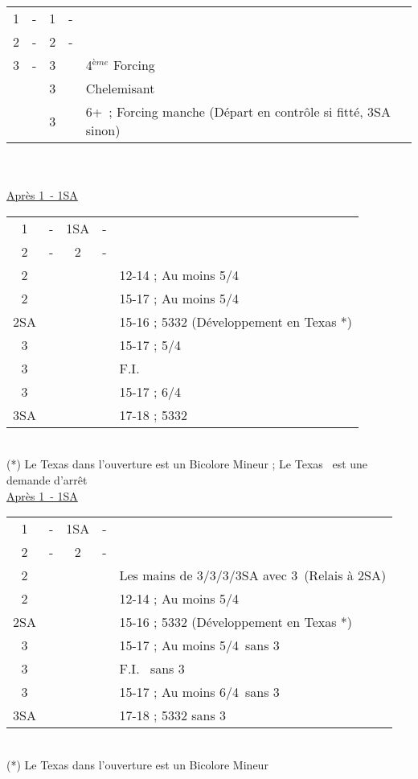 \documentclass[a4paper, oneside, 11pt]{report}
\begin{document}
		\begin{tabular}{cccc|l}
		1\coeur & - & 1\pique & - &\\
		2\trefle & - & 2\carreau & - &\\
		3\trefle & - & 3\carreau && 4$^{ème}$ Forcing\\
		&& 3\coeur && Chelemisant \coeur\\
		&& 3\pique && 6+\pique\ ; Forcing manche (Départ en contrôle si fitté, 3SA sinon)\\
		\end{tabular}\\\\

		\underline{Après 1\coeur\ - 1SA}

		\begin{tabular}{cccc|l}
		1\coeur & - & 1SA & - &\\
		2\trefle & - & 2\carreau & - &\\
		2\coeur &&&& 12-14 ; Au moins 5\coeur/4\trefle\\
		2\pique &&&& 15-17 ; Au moins 5\coeur/4\pique\\
		2SA &&&& 15-16 ; 5332 (Développement en Texas *)\\
		3\trefle &&&& 15-17 ; 5\coeur/4\trefle\\
		3\carreau &&&& F.I. \coeur\\
		3\coeur &&&& 15-17 ; 6\coeur/4\trefle\\
		3SA &&&& 17-18 ; 5332\\
		\end{tabular}\\
		(*) Le Texas dans l'ouverture est un Bicolore Mineur ; Le Texas \pique\ est une demande d'arrêt\\

		\underline{Après 1\pique\ - 1SA}

		\begin{tabular}{cccc|l}
		1\pique & - & 1SA & - &\\
		2\trefle & - & 2\carreau & - &\\
		2\coeur &&&& Les mains de 3\trefle/3\carreau/3\pique/3SA avec 3\coeur\ (Relais à 2SA)\\
		2\pique &&&& 12-14 ; Au moins 5\pique/4\trefle\\
		2SA &&&& 15-16 ; 5332 (Développement en Texas *)\\
		3\trefle &&&& 15-17 ; Au moins 5\pique/4\trefle\ sans 3\coeur\\
		3\carreau &&&& F.I. \pique\ sans 3\coeur\\
		3\pique &&&& 15-17 ; Au moins 6\pique/4\trefle\ sans 3\coeur\\
		3SA &&&& 17-18 ; 5332 sans 3\coeur\\
		\end{tabular}\\
		(*) Le Texas dans l'ouverture est un Bicolore Mineur
\end{document}
